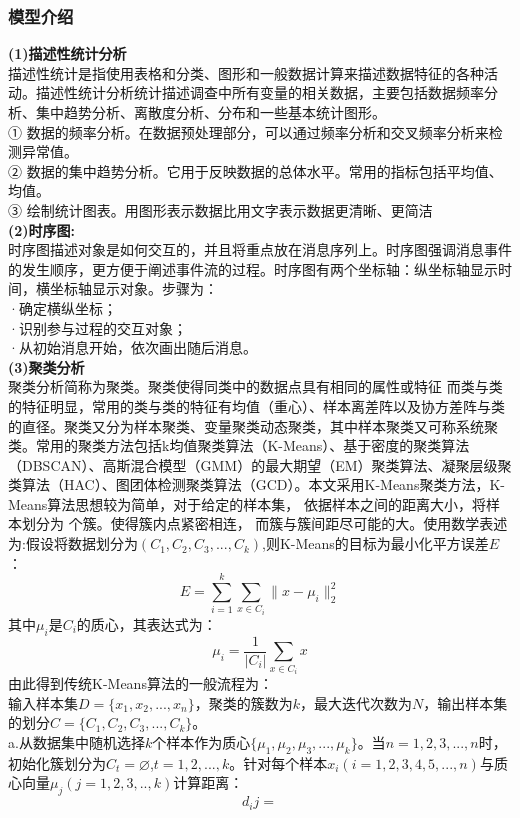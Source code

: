 \documentclass[UTF8]{article}
\begin{document}
     \subsubsection{模型介绍}
     \textbf{(1)描述性统计分析}\\
        描述性统计是指使用表格和分类、图形和一般数据计算来描述数据特征的各种活动。描述性统计分析统计描述调查中所有变量的相关数据，主要包括数据频率分析、集中趋势分析、离散度分析、分布和一些基本统计图形。\\
        ① 数据的频率分析。在数据预处理部分，可以通过频率分析和交叉频率分析来检测异常值。\\
        ② 数据的集中趋势分析。它用于反映数据的总体水平。常用的指标包括平均值、均值。\\
        ③ 绘制统计图表。用图形表示数据比用文字表示数据更清晰、更简洁\\
    \textbf{(2)时序图:}\\
         时序图描述对象是如何交互的，并且将重点放在消息序列上。时序图强调消息事件的发生顺序，更方便于阐述事件流的过程。时序图有两个坐标轴：纵坐标轴显示时间，横坐标轴显示对象。步骤为：\\
        ·确定横纵坐标；\\
        ·识别参与过程的交互对象；\\
        ·从初始消息开始，依次画出随后消息。\\
    \textbf{(3)聚类分析}\\
        聚类分析简称为聚类。聚类使得同类中的数据点具有相同的属性或特征
        而类与类的特征明显，常用的类与类的特征有均值（重心）、样本离差阵以及协方差阵与类的直径。聚类又分为样本聚类、变量聚类动态聚类，其中样本聚类又可称系统聚类。常用的聚类方法包括k均值聚类算法（K-Means）、基于密度的聚类算法（DBSCAN）、高斯混合模型（GMM）的最大期望（EM）聚类算法、凝聚层级聚类算法（HAC）、图团体检测聚类算法（GCD）。本文采用K-Means聚类方法，K-Means算法思想较为简单，对于给定的样本集，
        依据样本之间的距离大小，将样本划分为 个簇。使得簇内点紧密相连，
        而簇与簇间距尽可能的大。使用数学表述为:假设将数据划分为$( C_1,C_2,C_3,...,C_k) $,则K-Means的目标为最小化平方误差$E$：
                \begin{equation}
                    E=\sum_{i=1}^k\sum_{x \in C_i}\| x-\mu_i \|_2^2  
                \end{equation}
        其中$\mu_i$是$C_i$的质心，其表达式为：
                \begin{equation}
                    \mu_i = \frac{1}{|C_i|}\sum_{x \in C_i}x 
                \end{equation}
        由此得到传统K-Means算法的一般流程为：\\
            输入样本集$D=\{ x_1,x_2,...,x_n\} $，聚类的簇数为$k$，最大迭代次数为$N$，输出样本集的划分$C=\{ C_1,C_2,C_3,...,C_k\} $。\\
            a.从数据集中随机选择$k$个样本作为质心$\{\mu_1,\mu_2,\mu_3,...,\mu_k \}$。当$n=1,2,3,...,n$时，初始化簇划分为$C_t = \varnothing $,$t=1,2,...,k$。针对每个样本$x_i(i=1,2,3,4,5,...,n)$与质心向量$\mu_j(j=1,2,3,..,k)$计算距离：\\
                \begin{equation}
                    d_ij = 
                \end{equation}
                
                        



     
            

    


    
\end{document}
